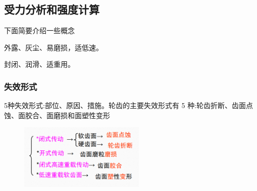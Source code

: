 \documentclass[twocolumn]{ctexart}
\begin{document}
\subsection{受力分析和强度计算}
下面简要介绍一些概念
\begin{description}[leftmargin=2.3cm,style=nextline,nosep]%
  \item[开式传动] 外露、灰尘、易磨损，适低速。
  \item[闭式传动]  封闭、润滑、适重用。
  \item[硬齿面齿轮]
  \item[软齿面齿轮] 
  \item[低速轻载]  
  \item[中速中载] 
  \item[高速重载] 
\end{description}
\subsubsection{失效形式} 
5种失效形式:部位、原因、措施。轮齿的主要失效形式有 5 种:轮齿折断、齿面点蚀、面胶合、面磨损和面塑性变形
        \begin{figure}[H]
            \centering
            \includegraphics[width=6cm]{img/4.png}
            \end{figure}
\end{document}
